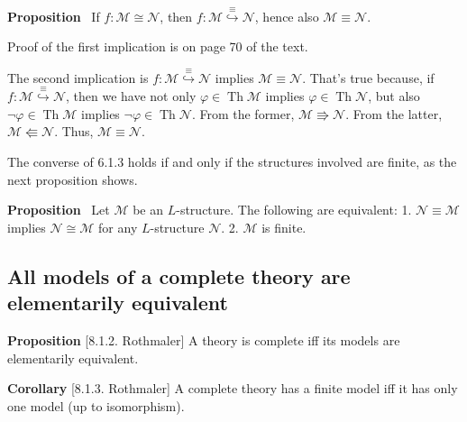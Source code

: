 \documentclass[a4paper,UKenglish,cleveref,autoref,thm-restate,12pt]{lipics-v2021-wjd}
\newcommand{\<}{\langle}
\renewcommand{\>}{\rangle}
\begin{document}
\textbf{Proposition}~\cite[6.1.3]{Rothmaler:2000} If
\(f \colon \mathcal M \cong \mathcal N\), then
\(f \colon \mathcal M \stackrel{\equiv}{\hookrightarrow} \mathcal N\),
hence also \(\mathcal M \equiv \mathcal N\).

Proof of the first implication is on page 70 of the text.

The second implication is
\(f \colon \mathcal M \stackrel{\equiv}{\hookrightarrow} \mathcal N\)
implies \(\mathcal M \equiv \mathcal N\). That's true because, if
\(f \colon \mathcal M \stackrel{\equiv}{\hookrightarrow} \mathcal N\),
then we have not only \(\varphi \in \operatorname{Th} \mathcal M\)
implies \(\varphi \in \operatorname{Th}\mathcal N\), but also
\(\neg \varphi \in \operatorname{Th} \mathcal M\) implies
\(\neg \varphi \in \operatorname{Th}\mathcal N\). From the former,
\(\mathcal M \Rrightarrow \mathcal N\). From the latter,
\(\mathcal M \Lleftarrow \mathcal N\). Thus,
\(\mathcal M \equiv \mathcal N\).


The converse of 6.1.3 holds if and only if the structures involved are
finite, as the next proposition shows.

\textbf{Proposition}~\cite[8.1.1]{Rothmaler:2000} Let \(\mathcal M\) be an
\(L\)-structure. The following are equivalent: 1.
\(\mathcal N \equiv \mathcal M\) implies \(\mathcal N \cong \mathcal M\)
for any \(L\)-structure \(\mathcal N\). 2. \(\mathcal M\) is finite.


\subsection{All models of a complete theory are elementarily
equivalent}\label{all-models-of-a-complete-theory-are-elementarily-equivalent}

\textbf{Proposition} {[}8.1.2. Rothmaler{]} A theory is complete iff its
models are elementarily equivalent.

\textbf{Corollary} {[}8.1.3. Rothmaler{]} A complete theory has a finite
model iff it has only one model (up to isomorphism).

\end{document}
